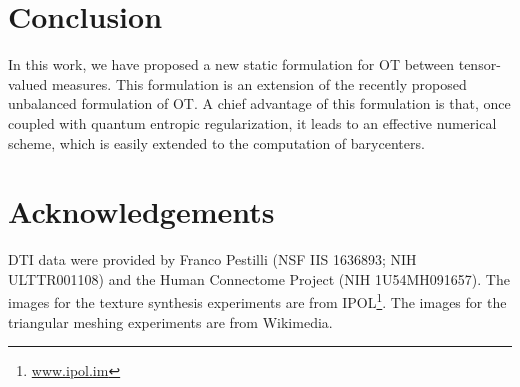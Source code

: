 
\section{Conclusion}

In this work, we have proposed a new static formulation for OT between tensor-valued measures. This formulation is an extension of the recently proposed unbalanced formulation of OT. A chief advantage of this formulation is that, once coupled with quantum entropic regularization, it leads to an effective numerical scheme, which is easily extended to the computation of barycenters. 


\section*{Acknowledgements}

%
DTI data were provided by Franco Pestilli (NSF IIS 1636893; NIH ULTTR001108) and the Human Connectome Project (NIH 1U54MH091657). 
%
The images for the texture synthesis experiments are from IPOL\footnote{\url{www.ipol.im}}.
% 
The images for the triangular meshing experiments are from Wikimedia.

